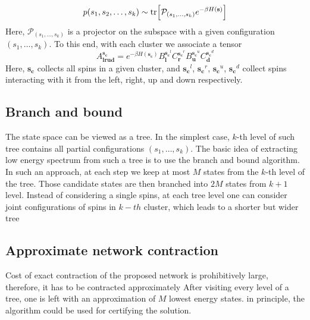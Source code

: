 \begin{equation}
    p(s_1, s_2, \ldots, s_k) \sim \tr[\mathcal{P}_{(s_1, \ldots, s_k)} e^{-\beta H(\mathbf{s})}]
\end{equation}
Here, $\mathcal{P}_{(s_1, \ldots, s_k)}$ is a projector on the subspace with a given configuration $(s_1, \ldots, s_k)$.
To this end, with each cluster we associate a tensor
\begin{equation}
A^{\mathbf{s_c}}_{\mathbf{lrud}} = e^{-\beta H(\mathbf{s_c})} B^{\mathbf{s_c}^l}_\mathbf{l}C^{\mathbf{s_c}^r}_\mathbf{r}B^{\mathbf{s_c}^u}_\mathbf{u}C^{\mathbf{s_c}^d}_\mathbf{d}
\end{equation}
Here, $\mathbf{s_c}$ collects all spins in a given cluster, and $\mathbf{s_c}^l$, $\mathbf{s_c}^r$, $\mathbf{s_c}^u$, $\mathbf{s_c}^d$ collect spins interacting with it from the left, right, up and down respectively.


\subsection{Branch and bound}
The state space can be viewed as a tree. In the simplest case, $k$-th level of such tree contains all partial configurations $(s_1, \ldots, s_k)$. The basic idea of extracting low energy spectrum from such a tree is to use the branch and bound algorithm. In such an approach, at each step we keep at most $M$ states from the $k$-th level of the tree. Those candidate states are then branched into $2M$ states from $k+1$ level. Instead of considering a single spins, at each tree level one can consider joint configurations of spins in $k-th$ cluster,
which leads to a shorter but wider tree 
\subsection{Approximate network contraction}
Cost of exact contraction of the proposed network is prohibitively large, therefore, it has to be contracted approximately
After visiting every level of a tree, one is left with an approximation of $M$ lowest energy states. in principle, the algorithm could be used for certifying the solution.

